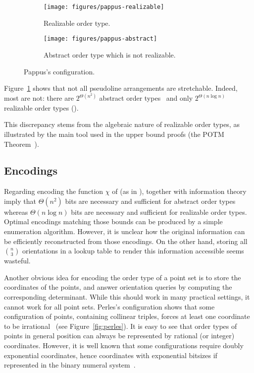 \begin{figure}
	\centering{}
    \begin{subfigure}[t]{0.5\textwidth}
		\centering{}
		\texttt{[image: figures/pappus-realizable]}
		\caption{Realizable order type.}
    \end{subfigure}%
    \begin{subfigure}[t]{0.5\textwidth}
		\centering{}
		\texttt{[image: figures/pappus-abstract]}
		\caption{Abstract order type which is not realizable.}
    \end{subfigure}
	\caption{Pappus's configuration.}\label{fig:pappus}
\end{figure}

Figure~\ref{fig:pappus} shows that not all pseudoline arrangements are
stretchable. Indeed, most are not: there are \(2^{\Theta(n^2)}\)
abstract order types~\cite{Fe96} and only \(2^{\Theta(n \log n)}\) realizable
order types ().
%

%
This discrepancy stems from the algebraic nature of realizable order types, as
illustrated by the main tool used in the upper bound proofs (the
POTM Theorem~\cite{Mi64,Th65,BPR06}).

\subsection{Encodings}

Regarding encoding the function \(\chi\) of 
(as in ),
 together with information theory
imply that \(\Theta(n^2)\) bits are necessary
and sufficient for abstract order types whereas \(\Theta(n \log n)\) bits are
necessary and sufficient for realizable order types.
Optimal encodings matching those bounds can be produced
by a simple enumeration algorithm.
%
However, it is unclear how the original information can be
efficiently reconstructed from those encodings.
%
On the other hand, storing all \( \binom{n}{3} \) orientations in a lookup
table to render this information accessible seems wasteful.

Another obvious idea for encoding the order type of a point set is to store
the coordinates of the points, and answer orientation queries
by computing the corresponding determinant. While this should work in many practical
settings, it cannot work for all point sets. Perles's configuration shows that
some configuration of points, containing collinear triples, forces at least one
coordinate to be irrational~\cite{Gr05} (see Figure~\ref{fig:perles}).
%
It is easy to see that
order types of points in general position can always be represented by rational
(or integer) coordinates.
%
However, it is well known that some configurations require doubly
exponential coordinates, hence coordinates with exponential bitsizes if
represented in the binary numeral system~\cite{GPS89}.

